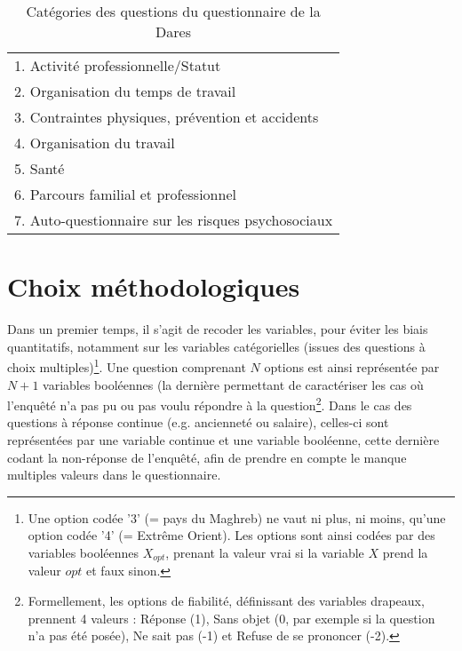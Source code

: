 \documentclass[11pt,fleqn,a4paper,openany,frenchb]{book} %
\begin{document}
\begin{table}[!h]
\centering
\begin{tabular}{|l|}
\hline
1. Activité professionnelle/Statut\\
2. Organisation du temps de travail \\
3. Contraintes physiques, prévention et accidents \\
4. Organisation du travail \\
5. Santé \\
6. Parcours familial et professionnel\\
7. Auto-questionnaire sur les risques psychosociaux\\
\hline
\end{tabular}%
\caption{Catégories des questions du questionnaire de la Dares}
\label{tab:cat_questions}
\end{table}


\section{Choix méthodologiques}
	Dans un premier temps, il s'agit de recoder les variables, pour éviter les biais quantitatifs, notamment sur les variables catégorielles (issues des questions à choix multiples)\footnote{Une option codée '3' (= pays du Maghreb) ne vaut ni plus, ni moins, qu'une option codée '4' (= Extrême Orient). Les options sont ainsi codées par des variables booléennes $X_{opt}$, prenant la valeur vrai
si la variable $X$ prend la valeur $opt$ et faux sinon.}. Une question comprenant $N$ options est ainsi représentée par $N+1$ variables booléennes (la dernière permettant de caractériser les cas où l'enquêté n'a pas pu ou pas voulu répondre à la question\footnote{Formellement, les options de fiabilité, définissant des variables drapeaux, prennent 4 valeurs : Réponse (1), Sans objet (0, par exemple si la question n'a pas été posée), Ne sait pas (-1) et Refuse de se prononcer (-2). }.
Dans le cas des questions à réponse continue (e.g. ancienneté ou salaire), celles-ci sont représentées par une variable continue et une variable booléenne, cette dernière codant la non-réponse de l'enquêté, afin de prendre en compte le manque multiples valeurs dans le questionnaire.\par
\end{document}
